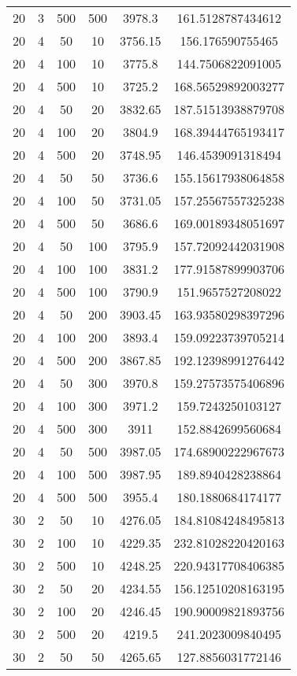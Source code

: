 {\begin{longtabu}{S
S
S
S
S[round-mode=places, round-precision=0]
S[round-mode=places, round-precision=0]}
20 & 3 & 500 & 500 & 3978.3 & 161.5128787434612 \\
20 & 4 & 50 & 10 & 3756.15 & 156.176590755465 \\
20 & 4 & 100 & 10 & 3775.8 & 144.7506822091005 \\
20 & 4 & 500 & 10 & 3725.2 & 168.56529892003277 \\
20 & 4 & 50 & 20 & 3832.65 & 187.51513938879708 \\
20 & 4 & 100 & 20 & 3804.9 & 168.39444765193417 \\
20 & 4 & 500 & 20 & 3748.95 & 146.4539091318494 \\
20 & 4 & 50 & 50 & 3736.6 & 155.15617938064858 \\
20 & 4 & 100 & 50 & 3731.05 & 157.25567557325238 \\
20 & 4 & 500 & 50 & 3686.6 & 169.00189348051697 \\
20 & 4 & 50 & 100 & 3795.9 & 157.72092442031908 \\
20 & 4 & 100 & 100 & 3831.2 & 177.91587899903706 \\
20 & 4 & 500 & 100 & 3790.9 & 151.9657527208022 \\
20 & 4 & 50 & 200 & 3903.45 & 163.93580298397296 \\
20 & 4 & 100 & 200 & 3893.4 & 159.09223739705214 \\
20 & 4 & 500 & 200 & 3867.85 & 192.12398991276442 \\
20 & 4 & 50 & 300 & 3970.8 & 159.27573575406896 \\
20 & 4 & 100 & 300 & 3971.2 & 159.7243250103127 \\
20 & 4 & 500 & 300 & 3911 & 152.8842699560684 \\
20 & 4 & 50 & 500 & 3987.05 & 174.68900222967673 \\
20 & 4 & 100 & 500 & 3987.95 & 189.8940428238864 \\
20 & 4 & 500 & 500 & 3955.4 & 180.1880684174177 \\
30 & 2 & 50 & 10 & 4276.05 & 184.81084248495813 \\
30 & 2 & 100 & 10 & 4229.35 & 232.81028220420163 \\
30 & 2 & 500 & 10 & 4248.25 & 220.94317708406385 \\
30 & 2 & 50 & 20 & 4234.55 & 156.12510208163195 \\
30 & 2 & 100 & 20 & 4246.45 & 190.90009821893756 \\
30 & 2 & 500 & 20 & 4219.5 & 241.2023009840495 \\
30 & 2 & 50 & 50 & 4265.65 & 127.8856031772146 \\

\end{longtabu}}
